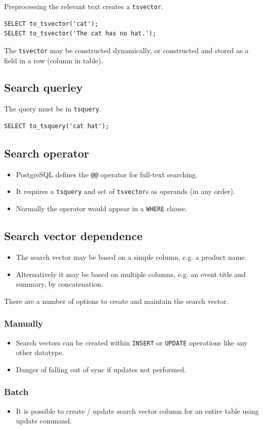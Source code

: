 \documentclass[slides]{pgnotes}
\begin{document}
Preprocessing the relevant text creates a \texttt{tsvector}.
\begin{verbatim}
SELECT to_tsvector('cat');
SELECT to_tsvector('The cat has no hat.');
\end{verbatim}
The \texttt{tsvector} may be constructed dynamically, or constructed and stored as a field in a row (column in table).

\subsection{Search queriey}

The query must be in \texttt{tsquery}.
\begin{verbatim}
SELECT to_tsquery('cat hat');
\end{verbatim}


\subsection{Search operator}

\begin{itemize}
\item PostgreSQL defines the \texttt{@@} operator for full-text searching.
\item It requires a \texttt{tsquery} and set of \texttt{tsvector}s as operands (in any order).
\item Normally the operator would appear in a \texttt{WHERE} clause.
\end{itemize}

\subsection{Search vector dependence}

\begin{itemize}
\item The search vector may be based on a simple column, e.g. a product name.
\item Alternatively it may be based on multiple columns, e.g. an event title and summary, by concatenation.
\end{itemize}
There are a number of options to create and maintain the search vector.

\subsubsection{Manually}

\begin{itemize}
\item Search vectors can be created within \texttt{INSERT} or \texttt{UPDATE} operations like any other datatype.
\item Danger of falling out of sync if updates not performed.
\end{itemize}

\subsubsection{Batch}

\begin{itemize}
\item It is possible to create / update search vector column for an entire table using update command.
\end{itemize}
\end{document}
